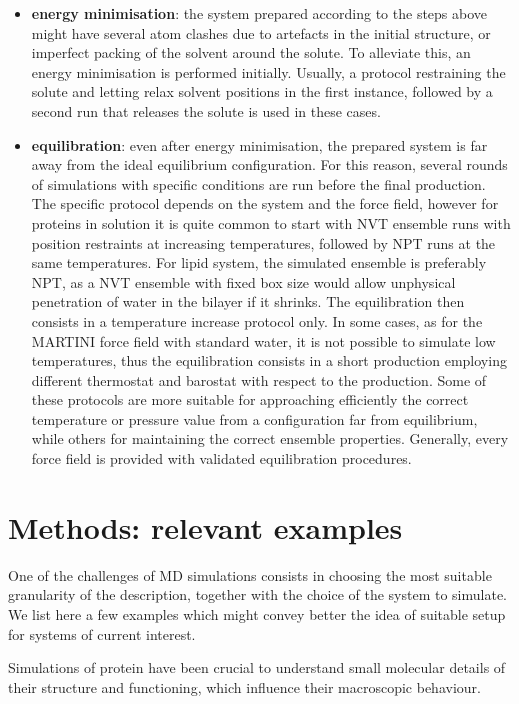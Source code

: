 \documentclass[graybox]{svmult}
\begin{document}
\begin{itemize}
%
\item \textbf{energy minimisation}: the system prepared according to the steps above might have several atom clashes due to artefacts in the initial structure, or imperfect packing of the solvent around the solute. To alleviate this, an energy minimisation is performed initially. Usually, a protocol restraining the solute and letting relax solvent positions in the first instance, followed by a second run that releases the solute is used in these cases.
%
\item \textbf{equilibration}: even after energy minimisation, the prepared system is far away from the ideal equilibrium configuration. For this reason, several rounds of simulations with specific conditions are run before the final production. The specific protocol depends on the system and the force field, however for proteins in solution it is quite common to start with NVT ensemble runs with position restraints at increasing temperatures, followed by NPT runs at the same temperatures. For lipid system, the simulated ensemble is preferably NPT, as a NVT ensemble with fixed box size would allow unphysical penetration of water in the bilayer if it shrinks. The equilibration then consists in a temperature increase protocol only. In some cases, as for the MARTINI force field with standard water, it is not possible to simulate low temperatures, thus the equilibration consists in a short production employing different thermostat and barostat with respect to the production. Some of these protocols are more suitable for approaching efficiently the correct temperature or pressure value from a configuration far from equilibrium, while others for maintaining the correct ensemble properties. Generally, every force field is provided with validated equilibration procedures.
\end{itemize}


\section{Methods: relevant examples} \label{sec:methods}
One of the challenges of MD simulations consists in choosing the most suitable granularity of the description, together with the choice of the system to simulate. We list here a few examples which might convey better the idea of suitable setup  for systems of current interest.

Simulations of protein have been crucial to understand small molecular details of their structure and functioning, which influence their macroscopic behaviour.
\end{document}
